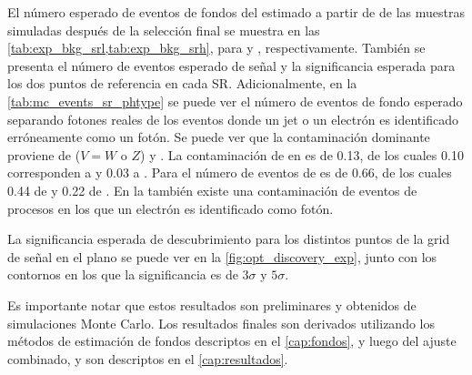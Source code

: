El número esperado de eventos de fondos del {\SM} estimado a partir de de las
muestras simuladas después de la selección final se muestra en las
\cref{tab:exp_bkg_srl,tab:exp_bkg_srh}, para {\SRL} y {\SRH},
respectivamente. También se presenta el número de eventos esperado de señal y la
significancia esperada para los dos puntos de referencia en cada SR.
Adicionalmente, en la \cref{tab:mc_events_sr_phtype} se puede ver el número de
eventos de fondo esperado separando fotones reales de los eventos donde un jet o
un electrón es identificado erróneamente como un fotón.
Se puede ver que la contaminación dominante proviene de {\vgam} ($V=W \text{ o }
Z$) y {\ttgam}. La contaminación de {\vgam} en {\SRL} es de 0.13, de los cuales
0.10 corresponden a {\wgam} y 0.03 a {\znngam}. Para {\SRH} el número de eventos
de {\vgam} es de 0.66, de los cuales 0.44 de {\wgam} y 0.22 de {\znngam}. En la
{\SRL} también existe una contaminación de eventos de procesos {\ttbar} en los
que un electrón es identificado como fotón.

La significancia esperada de descubrimiento para los distintos puntos
de la grid de señal en el plano {\mgmn} se puede ver en la
\cref{fig:opt_discovery_exp}, junto con los contornos en los que la significancia
es de $3\sigma$ y $5\sigma$.

Es
importante notar que estos resultados son preliminares y obtenidos de
simulaciones Monte Carlo. Los resultados finales son derivados utilizando los
métodos de estimación de fondos descriptos en el \cref{cap:fondos}, y luego
del ajuste combinado, y son descriptos en el \cref{cap:resultados}.

